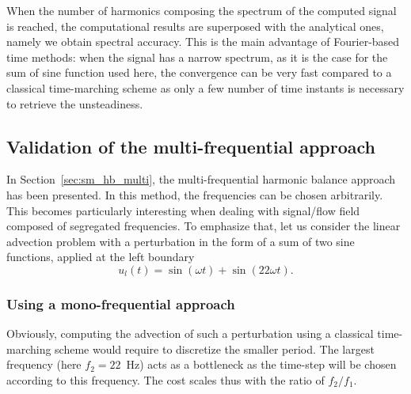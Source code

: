 When the number of harmonics composing the spectrum of the
computed signal is reached, the computational results are superposed
with the analytical ones, namely we obtain spectral accuracy.
This is the main advantage of Fourier-based time methods: when the
signal has a narrow spectrum, as it is the case for the sum
of sine function used here, the
convergence can be very fast compared to a classical time-marching scheme
as only a few number of time instants is necessary to retrieve the
unsteadiness.


\subsection{Validation of the multi-frequential approach}

In Section~\ref{sec:sm_hb_multi}, the multi-frequential harmonic
balance approach has been presented. In this method,
the frequencies can be chosen arbitrarily. This becomes particularly
interesting when dealing with signal/flow field composed of segregated
frequencies. To emphasize that, let us consider the linear advection problem
with a perturbation 
in the form of a sum of two sine functions,
applied at the left boundary
\begin{equation}
    u_l(t) = \sin(\omega t) + \sin(22 \omega t).
    \label{eq:multifreq_inj_func}
\end{equation}

\subsubsection{Using a mono-frequential approach}

Obviously, computing the advection of such a perturbation using
a classical time-marching scheme would require to discretize the
smaller period. The largest frequency
(here $f_2 = 22$~Hz) acts as a bottleneck as the time-step will be chosen
according to this frequency. The cost scales thus with the ratio of $f_2 / f_1$.


